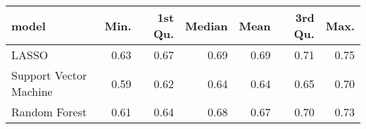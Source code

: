 
\begin{tabular}{lrrrrrr}
\toprule
model & Min. & 1st Qu. & Median & Mean & 3rd Qu. & Max.\\
\midrule
LASSO & 0.63 & 0.67 & 0.69 & 0.69 & 0.71 & 0.75\\
Support Vector Machine & 0.59 & 0.62 & 0.64 & 0.64 & 0.65 & 0.70\\
Random Forest & 0.61 & 0.64 & 0.68 & 0.67 & 0.70 & 0.73\\
\bottomrule
\end{tabular}
